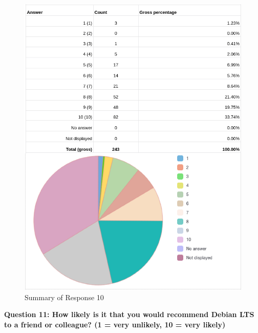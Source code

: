 \documentclass{article}
\begin{document}
\vspace{3mm}
\begin{figure}[h!]
\centering
\includegraphics[width=15.3cm]{assets/10-manual.png}
\caption{Summary of Response 10}
\end{figure}

\newpage

\Large{\textbf{Question 11: How likely is it that you would recommend Debian LTS to a friend or
colleague? (1 = very unlikely, 10 = very likely)}}
\end{document}
